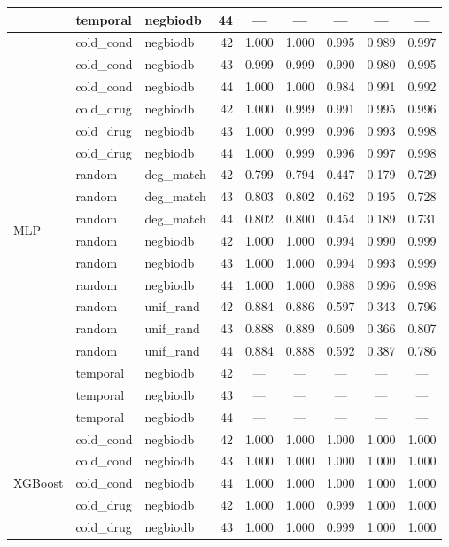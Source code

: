 \begin{table}[h]
\begin{tabular}{@{}lllrccccc@{}}
& temporal & negbiodb & 44 & --- & --- & --- & --- & --- \\
\midrule
\multirow{18}{*}{MLP}
& cold\_cond & negbiodb & 42 & 1.000 & 1.000 & 0.995 & 0.989 & 0.997 \\
& cold\_cond & negbiodb & 43 & 0.999 & 0.999 & 0.990 & 0.980 & 0.995 \\
& cold\_cond & negbiodb & 44 & 1.000 & 1.000 & 0.984 & 0.991 & 0.992 \\
& cold\_drug & negbiodb & 42 & 1.000 & 0.999 & 0.991 & 0.995 & 0.996 \\
& cold\_drug & negbiodb & 43 & 1.000 & 0.999 & 0.996 & 0.993 & 0.998 \\
& cold\_drug & negbiodb & 44 & 1.000 & 0.999 & 0.996 & 0.997 & 0.998 \\
& random & deg\_match & 42 & 0.799 & 0.794 & 0.447 & 0.179 & 0.729 \\
& random & deg\_match & 43 & 0.803 & 0.802 & 0.462 & 0.195 & 0.728 \\
& random & deg\_match & 44 & 0.802 & 0.800 & 0.454 & 0.189 & 0.731 \\
& random & negbiodb & 42 & 1.000 & 1.000 & 0.994 & 0.990 & 0.999 \\
& random & negbiodb & 43 & 1.000 & 1.000 & 0.994 & 0.993 & 0.999 \\
& random & negbiodb & 44 & 1.000 & 1.000 & 0.988 & 0.996 & 0.998 \\
& random & unif\_rand & 42 & 0.884 & 0.886 & 0.597 & 0.343 & 0.796 \\
& random & unif\_rand & 43 & 0.888 & 0.889 & 0.609 & 0.366 & 0.807 \\
& random & unif\_rand & 44 & 0.884 & 0.888 & 0.592 & 0.387 & 0.786 \\
& temporal & negbiodb & 42 & --- & --- & --- & --- & --- \\
& temporal & negbiodb & 43 & --- & --- & --- & --- & --- \\
& temporal & negbiodb & 44 & --- & --- & --- & --- & --- \\
\midrule
\multirow{18}{*}{XGBoost}
& cold\_cond & negbiodb & 42 & 1.000 & 1.000 & 1.000 & 1.000 & 1.000 \\
& cold\_cond & negbiodb & 43 & 1.000 & 1.000 & 1.000 & 1.000 & 1.000 \\
& cold\_cond & negbiodb & 44 & 1.000 & 1.000 & 1.000 & 1.000 & 1.000 \\
& cold\_drug & negbiodb & 42 & 1.000 & 1.000 & 0.999 & 1.000 & 1.000 \\
& cold\_drug & negbiodb & 43 & 1.000 & 1.000 & 0.999 & 1.000 & 1.000 \\

\end{tabular}
\end{table}

